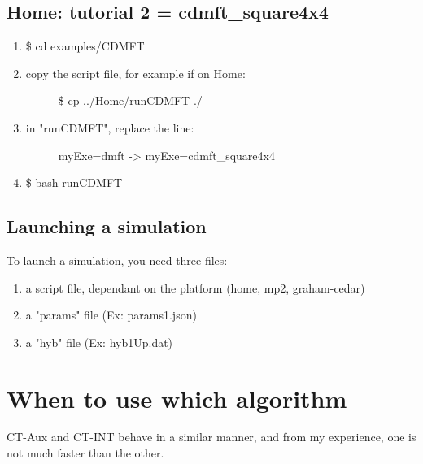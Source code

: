 \documentclass[letterpaper,10pt,english]{sphinxmanual}
\begin{document}
\subsection{Home: tutorial 2 = cdmft\_square4x4}
\label{\detokenize{tutorial:home-tutorial-2-cdmft-square4x4}}\begin{enumerate}
\item {} 
\$ cd examples/CDMFT

\item {} \begin{description}
\item[{copy the script file, for example if on Home:}] \leavevmode
\$ cp ../Home/runCDMFT ./

\end{description}

\item {} \begin{description}
\item[{in "runCDMFT", replace the line:}] \leavevmode
myExe=dmft  -\textgreater{} myExe=cdmft\_square4x4

\end{description}

\item {} 
\$ bash runCDMFT

\end{enumerate}


\subsection{Launching a simulation}
\label{\detokenize{tutorial:launching-a-simulation}}
To launch a simulation, you need three files:
\begin{enumerate}
\item {} 
a script file, dependant on the platform (home, mp2, graham-cedar)

\item {} 
a "params" file (Ex: params1.json)

\item {} 
a "hyb" file (Ex: hyb1Up.dat)

\end{enumerate}


\section{When to use which algorithm}
\label{\detokenize{tutorial:when-to-use-which-algorithm}}
CT-Aux and CT-INT behave in a similar manner, and from my experience, one is not much faster than the other.
\end{document}
